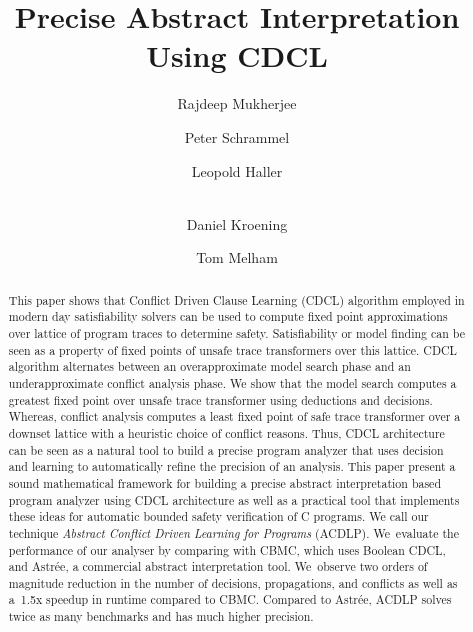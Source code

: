 \documentclass[a4paper]{llncs}
\begin{document}
\title{Precise Abstract Interpretation Using CDCL}

\author{Rajdeep Mukherjee \and Peter Schrammel \and 
Leopold Haller \and \\ 
Daniel Kroening \and Tom Melham}



\maketitle

\begin{abstract}
%
  This paper shows that Conflict Driven Clause Learning (CDCL) algorithm
  employed in modern day satisfiability solvers can be used to compute 
  fixed point approximations over lattice of program traces to determine 
  safety.  Satisfiability or model finding can be seen as a property of fixed 
  points of unsafe trace transformers over this lattice.  CDCL algorithm 
  alternates between an overapproximate model search phase and an 
  underapproximate conflict analysis phase.  We show that 
  the model search computes a greatest fixed point over unsafe trace transformer
  using deductions and decisions.  Whereas, conflict analysis computes a 
  least fixed point of safe trace transformer over a downset lattice with 
  a heuristic choice of conflict reasons.  Thus, CDCL architecture can be seen 
  as a natural tool to build a precise program analyzer that uses decision and 
  learning to automatically refine the precision of an analysis. This paper
  present a sound mathematical framework for building a precise abstract 
  interpretation based program analyzer using CDCL architecture as well as a practical tool 
  that implements these ideas for automatic bounded safety verification of C programs. 
  We call our technique \emph{Abstract Conflict Driven Learning for Programs} (ACDLP).
  We~evaluate the performance of our analyser by comparing with CBMC, which
  uses Boolean CDCL, and Astr{\'e}e, a commercial abstract interpretation tool. 
  We~observe two orders of magnitude reduction in the number of decisions,
  propagations, and conflicts as well as a~1.5x speedup in runtime compared to
  CBMC.  Compared to Astr{\'e}e, ACDLP solves twice as many benchmarks and has
  much higher precision.  
%
\end{abstract}
\end{document}
